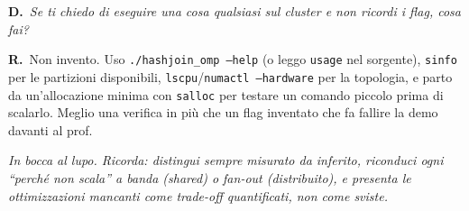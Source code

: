 \documentclass[11pt,a4paper]{article}
\newcommand{\D}[1]{\begin{dom}\small\textbf{D.}\ \itshape #1\end{dom}}
\newcommand{\R}{\noindent\textbf{R.}\ }
\begin{document}
\D{Se ti chiedo di eseguire una cosa qualsiasi sul cluster e non ricordi i flag, cosa fai?}
\R Non invento. Uso \texttt{./hashjoin\_omp --help} (o leggo \texttt{usage} nel sorgente), \texttt{sinfo} per le partizioni disponibili, \texttt{lscpu}/\texttt{numactl --hardware} per la topologia, e parto da un'allocazione minima con \texttt{salloc} per testare un comando piccolo prima di scalarlo. Meglio una verifica in più che un flag inventato che fa fallire la demo davanti al prof.

\begin{center}\itshape In bocca al lupo. Ricorda: distingui sempre misurato da inferito, riconduci ogni ``perché non scala'' a banda (shared) o fan-out (distribuito), e presenta le ottimizzazioni mancanti come trade-off quantificati, non come sviste.\end{center}
\end{document}
